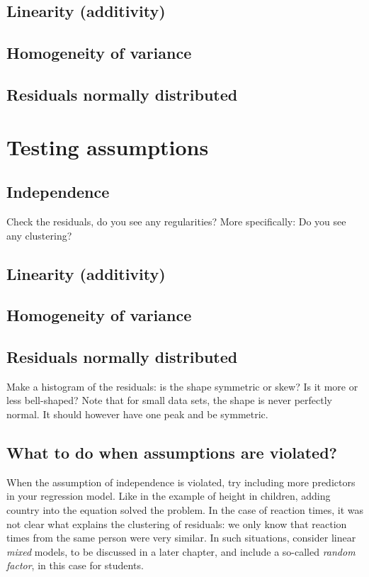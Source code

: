 \documentclass[]{report}\usepackage[]{graphicx}\usepackage[]{color}
\begin{document}
\subsection{Linearity (additivity)}
\subsection{Homogeneity of variance}
\subsection{Residuals normally distributed}

\section{Testing assumptions}
\subsection{Independence}

Check the residuals, do you see any regularities? More specifically: Do you see any clustering? 

\subsection{Linearity (additivity)}
\subsection{Homogeneity of variance}
\subsection{Residuals normally distributed}

Make a histogram of the residuals: is the shape symmetric or skew? Is it more or less bell-shaped? Note that for small data sets, the shape is never perfectly normal. It should however have one peak and be symmetric.

\subsection{What to do when assumptions are violated?}

When the assumption of independence is violated, try including more predictors in your regression model. Like in the example of height in children, adding country into the equation solved the problem. In the case of reaction times, it was not clear what explains the clustering of residuals: we only know that reaction times from the same person were very similar. In such situations, consider linear \textit{mixed} models, to be discussed in a later chapter, and include a so-called \textit{random factor}, in this case for students. 
\end{document}
